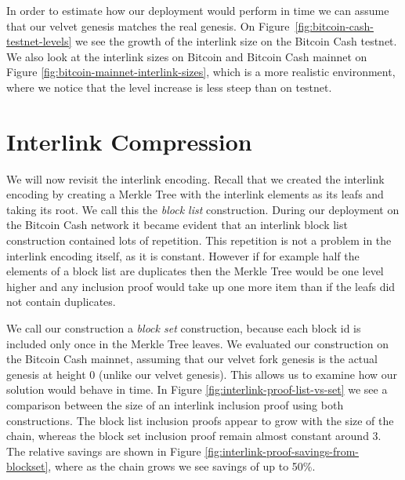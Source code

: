 In order to estimate how our deployment would perform in time we can assume that our velvet genesis matches the real genesis. On Figure~\ref{fig:bitcoin-cash-testnet-levels} we see the growth of the interlink size on the Bitcoin Cash testnet. We also look at the interlink sizes on Bitcoin and Bitcoin Cash mainnet on Figure \ref{fig:bitcoin-mainnet-interlink-sizes}, which is a more realistic environment, where we notice that the level increase is less steep than on testnet.


\section{Interlink Compression}
We will now revisit the interlink encoding. Recall that we created the interlink encoding by creating a Merkle Tree with the interlink elements as its leafs and taking its root. We call this the \textit{block list} construction. During our deployment on the Bitcoin Cash network it became evident that an interlink block list construction contained lots of repetition. This repetition is not a problem in the interlink encoding itself, as it is constant. However if for example half the elements of a block list are duplicates then the Merkle Tree would be one level higher and any inclusion proof would take up one more item than if the leafs did not contain duplicates.

We call our construction a \textit{block set} construction, because each block id is included only once in the Merkle Tree leaves. We evaluated our construction on the Bitcoin Cash mainnet, assuming that our velvet fork genesis is the actual genesis at height 0 (unlike our velvet genesis). This allows us to examine how our solution would behave in time. In Figure \ref{fig:interlink-proof-list-vs-set} we see a comparison between the size of an interlink inclusion proof using both constructions. The block list inclusion proofs appear to grow with the size of the chain, whereas the block set inclusion proof remain almost constant around 3. The relative savings are shown in Figure \ref{fig:interlink-proof-savings-from-blockset}, where as the chain grows we see savings of up to 50\%.


